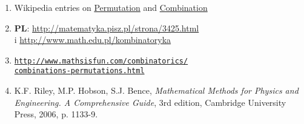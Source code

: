 \documentclass{article}
\begin{document}
\begin{enumerate}
    \item{Wikipedia entries on \href{http://en.wikipedia.org/wiki/Permutation}{Permutation} and \href{http://en.wikipedia.org/wiki/Combination}{Combination}}
    \item{\textbf{PL}: \url{http://matematyka.pisz.pl/strona/3425.html}\\i \url{http://www.math.edu.pl/kombinatoryka}}
    \item{%
        \label{itm:mathsisfun}
        \href{http://www.mathsisfun.com/combinatorics/combinations-permutations.html}{\nolinkurl{http://www.mathsisfun.com/combinatorics/}}\\
        \href{http://www.mathsisfun.com/combinatorics/combinations-permutations.html}{\nolinkurl{combinations-permutations.html}}
    }
    \item{K.F. Riley, M.P. Hobson, S.J. Bence, \textit{Mathematical Methods for Physics and Engineering. A Comprehensive Guide}, 3rd edition, Cambridge University Press, 2006, p. 1133-9.}
\end{enumerate}
\end{document}
